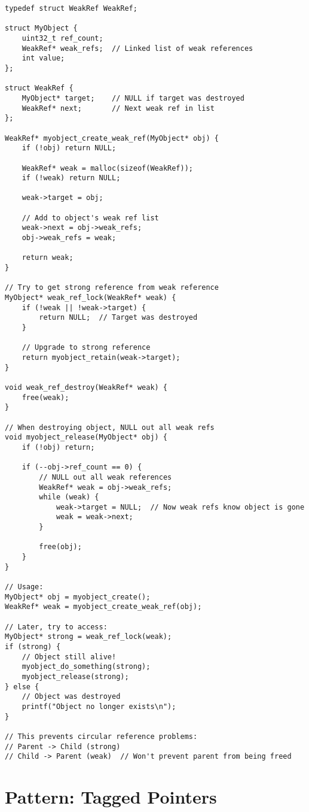 \begin{lstlisting}
typedef struct WeakRef WeakRef;

struct MyObject {
    uint32_t ref_count;
    WeakRef* weak_refs;  // Linked list of weak references
    int value;
};

struct WeakRef {
    MyObject* target;    // NULL if target was destroyed
    WeakRef* next;       // Next weak ref in list
};

WeakRef* myobject_create_weak_ref(MyObject* obj) {
    if (!obj) return NULL;

    WeakRef* weak = malloc(sizeof(WeakRef));
    if (!weak) return NULL;

    weak->target = obj;

    // Add to object's weak ref list
    weak->next = obj->weak_refs;
    obj->weak_refs = weak;

    return weak;
}

// Try to get strong reference from weak reference
MyObject* weak_ref_lock(WeakRef* weak) {
    if (!weak || !weak->target) {
        return NULL;  // Target was destroyed
    }

    // Upgrade to strong reference
    return myobject_retain(weak->target);
}

void weak_ref_destroy(WeakRef* weak) {
    free(weak);
}

// When destroying object, NULL out all weak refs
void myobject_release(MyObject* obj) {
    if (!obj) return;

    if (--obj->ref_count == 0) {
        // NULL out all weak references
        WeakRef* weak = obj->weak_refs;
        while (weak) {
            weak->target = NULL;  // Now weak refs know object is gone
            weak = weak->next;
        }

        free(obj);
    }
}

// Usage:
MyObject* obj = myobject_create();
WeakRef* weak = myobject_create_weak_ref(obj);

// Later, try to access:
MyObject* strong = weak_ref_lock(weak);
if (strong) {
    // Object still alive!
    myobject_do_something(strong);
    myobject_release(strong);
} else {
    // Object was destroyed
    printf("Object no longer exists\n");
}

// This prevents circular reference problems:
// Parent -> Child (strong)
// Child -> Parent (weak)  // Won't prevent parent from being freed
\end{lstlisting}

\section{Pattern: Tagged Pointers}

